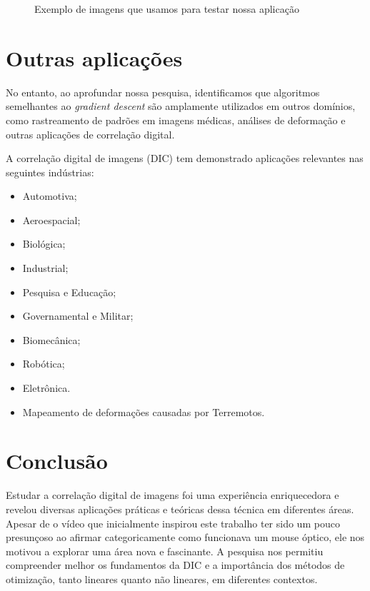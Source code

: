 \documentclass[a4paper,12pt]{article}
\begin{document}
\begin{figure}%
    \centering
    \qquad
    \caption{Exemplo de imagens que usamos para testar nossa aplicação}
\end{figure}



\section{Outras aplicações}
No entanto, ao aprofundar nossa pesquisa, identificamos que algoritmos semelhantes ao \textit{gradient descent} são amplamente utilizados em outros domínios, como rastreamento de padrões em imagens médicas, análises de deformação e outras aplicações de correlação digital.


A correlação digital de imagens (DIC) tem demonstrado aplicações relevantes nas seguintes indústrias:

\begin{itemize}
    \item Automotiva;
    \item Aeroespacial;
    \item Biológica;
    \item Industrial;
    \item Pesquisa e Educação;
    \item Governamental e Militar;
    \item Biomecânica;
    \item Robótica;
    \item Eletrônica.
    \item Mapeamento de deformações causadas por Terremotos.
\end{itemize}


\section{Conclusão}

Estudar a correlação digital de imagens foi uma experiência enriquecedora e revelou diversas aplicações práticas e teóricas dessa técnica em diferentes áreas. Apesar de o vídeo que inicialmente inspirou este trabalho ter sido um pouco presunçoso ao afirmar categoricamente como funcionava um mouse óptico, ele nos motivou a explorar uma área nova e fascinante. A pesquisa nos permitiu compreender melhor os fundamentos da DIC e a importância dos métodos de otimização, tanto lineares quanto não lineares, em diferentes contextos.
\end{document}
